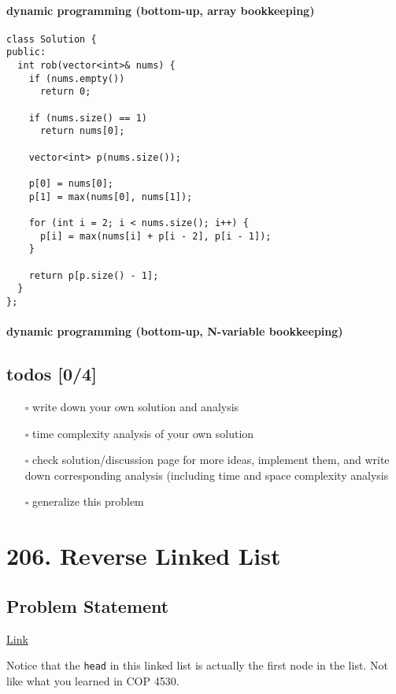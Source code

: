 \documentclass[11pt]{article}
\begin{document}
\paragraph{dynamic programming (bottom-up, array bookkeeping)}
\label{sec:orgd7cc76b}
\begin{verbatim}
class Solution {
public:  
  int rob(vector<int>& nums) {
    if (nums.empty())
      return 0;

    if (nums.size() == 1)
      return nums[0];

    vector<int> p(nums.size());

    p[0] = nums[0];
    p[1] = max(nums[0], nums[1]);

    for (int i = 2; i < nums.size(); i++) {
      p[i] = max(nums[i] + p[i - 2], p[i - 1]);
    }

    return p[p.size() - 1];
  }
};
\end{verbatim}
\paragraph{dynamic programming (bottom-up, N-variable bookkeeping)}
\label{sec:org02e4c8c}
\subsection{todos [0/4]}
\label{sec:org42f3f45}
\begin{itemize}
\item[{$\square$}] write down your own solution and analysis
\item[{$\square$}] time complexity analysis of your own solution
\item[{$\square$}] check solution/discussion page for more ideas, implement them, and write down corresponding analysis (including time and space complexity analysis
\item[{$\square$}] generalize this problem
\end{itemize}
\section{206. Reverse Linked List}
\label{sec:org54d4ed3}
\subsection{Problem Statement}
\label{sec:org81618b1}
\href{https://leetcode.com/problems/reverse-linked-list/}{Link}

Notice that the \texttt{head} in this linked list is actually the first node in the list. Not like what you learned in COP 4530.
\end{document}

